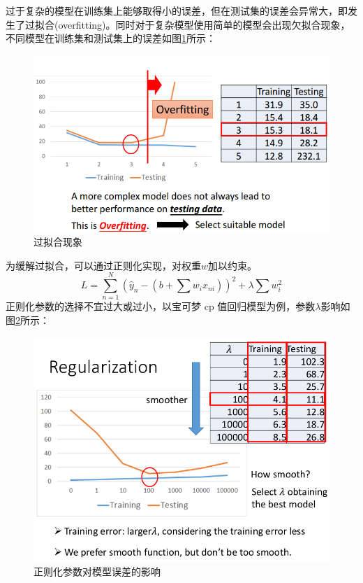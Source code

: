 过于复杂的模型在训练集上能够取得小的误差，但在测试集的误差会异常大，即发生了过拟合(overfitting)。同时对于复杂模型使用简单的模型会出现欠拟合现象，不同模型在训练集和测试集上的误差如图\ref{fig:overfitting}所示：
\begin{figure}
	\centering
	\includegraphics[scale=0.5]{pic/overfitting.png}
	\caption{过拟合现象}
	\label{fig:overfitting}
\end{figure}
为缓解过拟合，可以通过正则化实现，对权重$w$加以约束。
\[
	L = \sum_{n=1}^{N} \left(\hat{y}_n - (b+ \sum w_i x_{ni}) \right) ^2 + \lambda  \sum w_i^2 
\]
正则化参数的选择不宜过大或过小，以宝可梦 cp 值回归模型为例，参数$\lambda$影响如图\ref{fig:regularization_inflect}所示：
\begin{figure}
	\centering
	\includegraphics[scale=0.5]{pic/regularization.png}
	\caption{正则化参数对模型误差的影响}
	\label{fig:regularization_inflect}
\end{figure}

